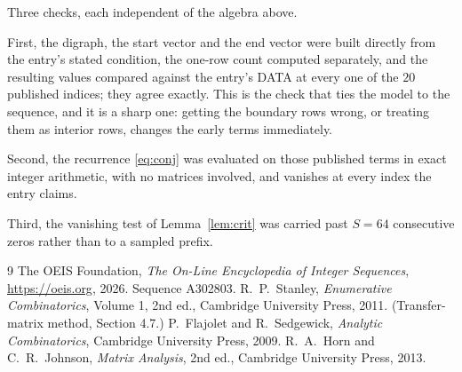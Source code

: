 \documentclass[11pt,a4paper]{article}
\theoremstyle{plain}
\theoremstyle{definition}
\begin{document}
Three checks, each independent of the algebra above.

First, the digraph, the start vector and the end vector were built directly from the
entry's stated condition, the one-row count computed separately, and the resulting values
compared against the entry's DATA at every one of the $20$ published indices; they
agree exactly. This is the check that ties the model to the sequence, and it is a sharp one:
getting the boundary rows wrong, or treating them as interior rows, changes the early terms
immediately.

Second, the recurrence \eqref{eq:conj} was evaluated on those published terms in exact
integer arithmetic, with no matrices involved, and vanishes at every index the entry claims.

Third, the vanishing test of Lemma~\ref{lem:crit} was carried past $S=64$ consecutive
zeros rather than to a sampled prefix.

\begin{thebibliography}{9}
 The OEIS Foundation, \emph{The On-Line Encyclopedia of Integer
Sequences}, \url{https://oeis.org}, 2026. Sequence A302803.
 R.~P.~Stanley, \emph{Enumerative Combinatorics}, Volume 1, 2nd ed.,
Cambridge University Press, 2011. (Transfer-matrix method, Section 4.7.)
 P.~Flajolet and R.~Sedgewick, \emph{Analytic Combinatorics}, Cambridge
University Press, 2009.
 R.~A.~Horn and C.~R.~Johnson, \emph{Matrix Analysis}, 2nd ed., Cambridge
University Press, 2013.
\end{thebibliography}
\end{document}

